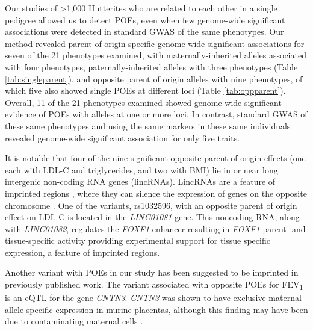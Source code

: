 Our studies of \textgreater1,000 Hutterites who are related to each other in a single pedigree allowed us to detect POEs, even when few genome-wide significant associations were detected in standard GWAS of the same phenotypes. Our method revealed parent of origin specific genome-wide significant associations for seven of the 21 phenotypes examined, with maternally-inherited alleles associated with four phenotypes, paternally-inherited alleles with three phenotypes (Table \ref{tab:singleparent}), and opposite parent of origin alleles with nine phenotypes, of which five also showed single POEs at different loci (Table \ref{tab:oppparent}). Overall, 11 of the 21 phenotypes examined showed genome-wide significant evidence of POEs with alleles at one or more loci. In contrast, standard GWAS of these same phenotypes and using the same markers in these same individuals revealed genome-wide significant association for only five traits. 

It is notable that four of the nine significant opposite parent of origin effects (one each with LDL-C and triglycerides, and two with BMI) lie in or near long intergenic non-coding RNA genes (lincRNAs). LincRNAs are a feature of imprinted regions \cite{Peters2014}, where they can silence the expression of genes on the opposite chromosome \cite{Barlow:2014dv,Patten:2016cb}. One of the variants, rs1032596, with an opposite parent of origin effect on LDL-C is located in the \emph{LINC01081} gene. This noncoding RNA, along with \emph{LINC01082}, regulates the \emph{FOXF1} enhancer resulting in \emph{FOXF1} parent- and tissue-specific activity\cite{Szafranski:2016fz} providing experimental support for tissue specific expression, a feature of imprinted regions. 

Another variant with POEs in our study has been suggested to be imprinted in previously published work. The variant associated with opposite POEs for FEV\textsubscript{1} is an eQTL for the gene \emph{CNTN3}. \emph{CNTN3} was shown to have exclusive maternal allele-specific expression in murine placentas\cite{Brideau:2010gz}, although this finding may have been due to contaminating maternal cells \cite{Okae:2011hj,Proudhon:2011eh}. 

